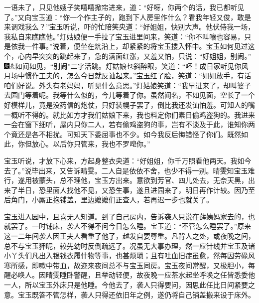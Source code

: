 一语未了，只见他嫂子笑嘻嘻掀帘进来，道：“好呀，你两个的话，我已都听见了。”又向宝玉道：“你一个作主子的，跑到下人房里作什么？看我年轻又俊，敢是来调戏我么？”宝玉听说，吓的忙陪笑央道：“好姐姐，快别大声。他伏侍我一场，我私自来瞧瞧他。”灯姑娘便一手拉了宝玉进里间来，笑道：“你不叫嚷也容易，只是依我一件事。”说着，便坐在炕沿上，却紧紧的将宝玉搂入怀中。宝玉如何见过这个，心内早突突的跳起来了，急的满面红涨，又羞又怕，只说：“好姐姐，别闹。”{\includegraphics[width=3mm]{../Images/00004}\includegraphics[width=3mm]{../Images/00012}\footnotesize \kaishu 如闻如见，“别闹”二字活跳。}灯姑娘乜斜醉眼，笑道：“呸！成日家听见你风月场中惯作工夫的，怎么今日就反讪起来。”宝玉红了脸，笑道：“姐姐放手，有话咱们好说。外头有老妈妈，听见什么意思。”灯姑娘笑道：“我早进来了，却叫婆子去园门等着呢。我等什么似的，今儿等着了你。虽然闻名，不如见面，空长了一个好模样儿，竟是没药信的炮仗，只好装幌子罢了，倒比我还发讪怕羞。可知人的嘴一概听不得的。就比如方才我们姑娘下来，我也料定你们素日偷鸡盗狗的。我进来一会在窗下细听，屋内只你二人，若有偷鸡盗狗的事，岂有不谈及于此，谁知你两个竟还是各不相扰。可知天下委屈事也不少。如今我反后悔错怪了你们。既然如此，你但放心。以后你只管来，我也不罗唣你。”

宝玉听说，才放下心来，方起身整衣央道：“好姐姐，你千万照看他两天。我如今去了。”说毕出来，又告诉晴雯。二人自是依依不舍，也少不得一别。晴雯知宝玉难行，遂用被蒙头，总不理他，宝玉方出来。意欲到芳官、四儿处去，无奈天黑，出来了半日，恐里面人找他不见，又恐生事，遂且进园来了，明日再作计较。因乃至后角门，小厮正抱铺盖，里边嬷嬷们正查人，若再迟一步也就关了。

宝玉进入园中，且喜无人知道。到了自己房内，告诉袭人只说在薛姨妈家去的，也就罢了。一时铺床，袭人不得不问今日怎么睡。宝玉道：“不管怎么睡罢了。”原来这一二年间袭人因王夫人看重了他了，越发自要尊重。凡背人之处，或夜晚之间，总不与宝玉狎昵，较先幼时反倒疏远了。况虽无大事办理，然一应针线并宝玉及诸小丫头们凡出入银钱衣履什物等事，也甚烦琐；且有吐血旧症虽愈，然每因劳碌风寒所感，即嗽中带血，故迩来夜间总不与宝玉同房。宝玉夜间常醒，又极胆小，每醒必唤人。因晴雯睡卧警醒，且举动轻便，故夜晚一应茶水起坐呼唤之任皆悉委他一人，所以宝玉外床只是他睡。今他去了，袭人只得要问，因思此任比日间紧要之意。宝玉既答不管怎样，袭人只得还依旧年之例，遂仍将自己铺盖搬来设于床外。

